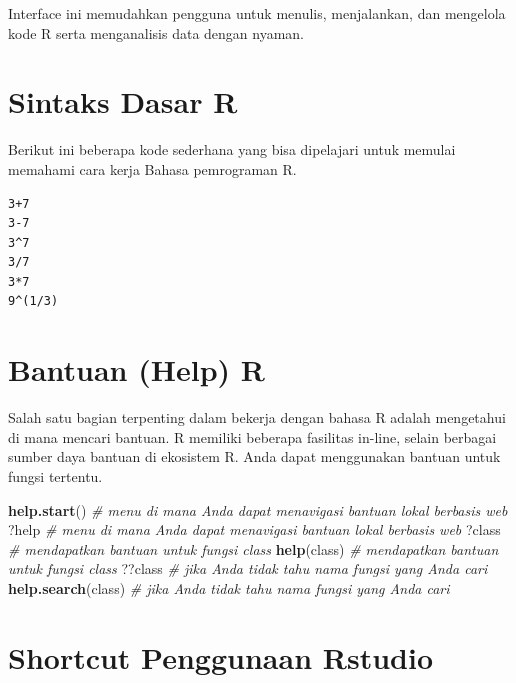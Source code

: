 \documentclass[
]{book}
\newenvironment{Shaded}{\begin{snugshade}}{\end{snugshade}}
\newcommand{\CommentTok}[1]{\textcolor[rgb]{0.56,0.35,0.01}{\textit{#1}}}
\newcommand{\FunctionTok}[1]{\textcolor[rgb]{0.13,0.29,0.53}{\textbf{#1}}}
\newcommand{\NormalTok}[1]{#1}
\newcommand{\StringTok}[1]{\textcolor[rgb]{0.31,0.60,0.02}{#1}}
\begin{document}
Interface ini memudahkan pengguna untuk menulis, menjalankan, dan mengelola kode R serta menganalisis data dengan nyaman.

\hypertarget{sintaks-dasar-r}{%
\section{Sintaks Dasar R}\label{sintaks-dasar-r}}

Berikut ini beberapa kode sederhana yang bisa dipelajari untuk memulai memahami cara kerja Bahasa pemrograman R.

\begin{verbatim}
3+7
3-7
3^7
3/7
3*7
9^(1/3)
\end{verbatim}

\hypertarget{bantuan-help-r}{%
\section{Bantuan (Help) R}\label{bantuan-help-r}}

Salah satu bagian terpenting dalam bekerja dengan bahasa R adalah mengetahui di mana mencari bantuan. R memiliki beberapa fasilitas in-line, selain berbagai sumber daya bantuan di ekosistem R. Anda dapat menggunakan bantuan untuk fungsi tertentu.

\begin{Shaded}
\begin{Highlighting}[]
\FunctionTok{help.start}\NormalTok{()         }\CommentTok{\# menu di mana Anda dapat menavigasi bantuan lokal berbasis web}
\NormalTok{?help                }\CommentTok{\# menu di mana Anda dapat menavigasi bantuan lokal berbasis web }
\NormalTok{?class               }\CommentTok{\# mendapatkan bantuan untuk fungsi \textasciigrave{}class\textasciigrave{}}
\FunctionTok{help}\NormalTok{(class)          }\CommentTok{\# mendapatkan bantuan untuk fungsi \textasciigrave{}class\textasciigrave{}}
\NormalTok{??class              }\CommentTok{\# jika Anda tidak tahu nama fungsi yang Anda cari}
\FunctionTok{help.search}\NormalTok{(}\StringTok{\textquotesingle{}class\textquotesingle{}}\NormalTok{) }\CommentTok{\# jika Anda tidak tahu nama fungsi yang Anda cari}
\end{Highlighting}
\end{Shaded}

\hypertarget{shortcut-penggunaan-rstudio}{%
\section{Shortcut Penggunaan Rstudio}\label{shortcut-penggunaan-rstudio}}
\end{document}
